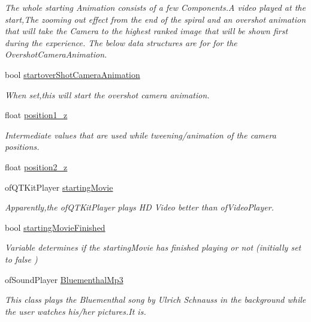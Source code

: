 \begin{DoxyCompactItemize}
\begin{DoxyCompactList}\small\item\em The whole starting Animation consists of a few Components.\-A video played at the start,The zooming out effect from the end of the spiral and an overshot animation that will take the Camera to the highest ranked image that will be shown first during the experience. The below data structures are for for the Overshot\-Camera\-Animation. \end{DoxyCompactList}\item 
bool \hyperlink{classtest_app_ad2fca6ce5e37462cd820afc48633324d}{startover\-Shot\-Camera\-Animation}
\begin{DoxyCompactList}\small\item\em When set,this will start the overshot camera animation. \end{DoxyCompactList}\item 
float \hyperlink{classtest_app_a808376783cdf510335cd1b37026e9bb3}{position1\-\_\-z}
\begin{DoxyCompactList}\small\item\em Intermediate values that are used while tweening/animation of the camera positions. \end{DoxyCompactList}\item 
float \hyperlink{classtest_app_a0720011cfaade6388109232ea4927c19}{position2\-\_\-z}
\item 
of\-Q\-T\-Kit\-Player \hyperlink{classtest_app_a9bfe7793fa0689a991ff64174745c38f}{starting\-Movie}
\begin{DoxyCompactList}\small\item\em Apparently,the of\-Q\-T\-Kit\-Player plays H\-D Video better than of\-Video\-Player. \end{DoxyCompactList}\item 
bool \hyperlink{classtest_app_aea3cb9f5f0061a42a4953d6b6c949036}{starting\-Movie\-Finished}
\begin{DoxyCompactList}\small\item\em Variable determines if the starting\-Movie has finished playing or not (initially set to false ) \end{DoxyCompactList}\item 
of\-Sound\-Player \hyperlink{classtest_app_af696fd13ee9ecb38ac0ba0b72543ce06}{Bluementhal\-Mp3}
\begin{DoxyCompactList}\small\item\em This class plays the Bluementhal song by Ulrich Schnauss in the background while the user watches his/her pictures.\-It is. \end{DoxyCompactList}\item 

\end{DoxyCompactItemize}
